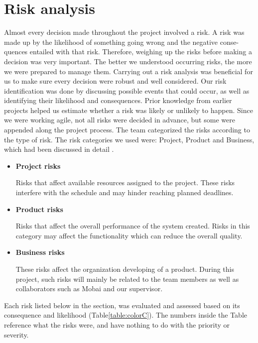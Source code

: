 \section{Risk analysis} 
Almost every decision made throughout the project involved a risk. A risk was made up by the likelihood of something going wrong and the negative conse-quences entailed with that risk. Therefore, weighing up the risks before making a decision was very important. The better we understood occurring risks, the more we were prepared to manage them. Carrying out a risk analysis was beneficial for us to make sure every decision were robust and well considered. Our risk identification was done by discussing possible events that could occur, as well as identifying their likelihood and consequences. Prior knowledge from earlier projects helped us estimate whether a risk was likely or unlikely to happen. Since we were working agile, not all risks were decided in advance, but some were appended along the project process. The team categorized the risks according to the type of risk. The risk categories we used were: Project, Product and Business, which had been discussed in  detail \cite{RiskAnalysis}. 

\begin{itemize}
    \item \textbf{Project risks} 
        \par Risks that affect available resources assigned to the project. These risks interfere with the schedule and may hinder reaching planned deadlines. 
    \item \textbf{Product risks} 
        \par Risks that affect the overall performance of the system created. Risks in this category may affect the functionality which can reduce the overall quality. 
    \item \textbf{Business risks}
        \par These risks affect the organization developing of a product. During this project, such risks will mainly be related to the team members as well as collaborators such as Mobai and our supervisor. 
\end{itemize}

Each risk listed below in the section, was evaluated and assessed based on its consequence and likelihood (Table\ref{table:colorC}). The numbers inside the Table reference what the risks were, and have nothing to do with the priority or severity. 
    
